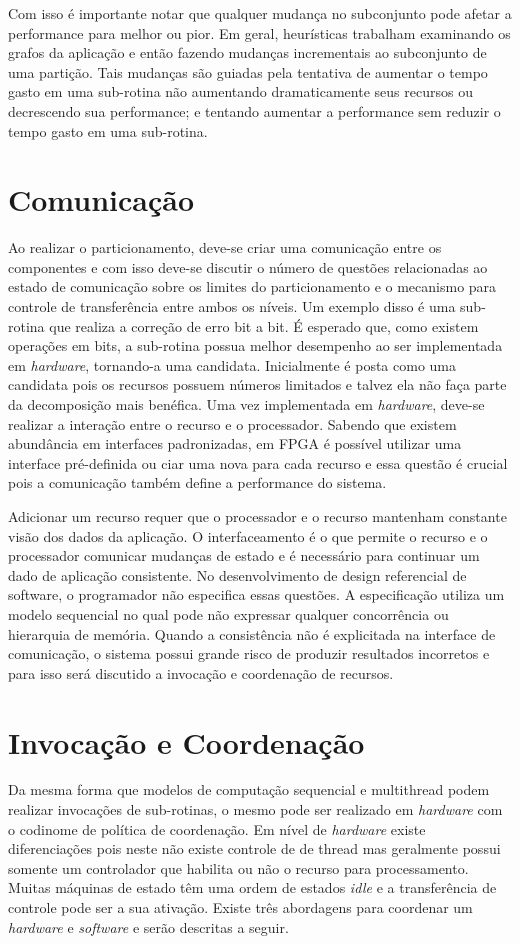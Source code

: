 Com isso é importante notar que qualquer mudança no subconjunto pode afetar a performance para melhor ou pior. Em geral, heurísticas trabalham examinando os grafos da aplicação e então fazendo mudanças incrementais ao subconjunto de uma partição. Tais mudanças são guiadas pela tentativa de aumentar o tempo gasto em uma sub-rotina não aumentando dramaticamente seus recursos ou decrescendo sua performance; e tentando aumentar a performance sem reduzir o tempo gasto em uma sub-rotina.

\section{Comunicação}
Ao realizar o particionamento, deve-se criar uma comunicação entre os componentes e com isso deve-se discutir o número de questões relacionadas ao estado de comunicação sobre os limites do particionamento e o mecanismo para controle de transferência entre ambos os níveis. Um exemplo disso é uma sub-rotina que realiza a correção de erro bit a bit. É esperado que, como existem operações em bits, a sub-rotina possua melhor desempenho ao ser implementada em \textit{hardware}, tornando-a uma candidata. Inicialmente é posta como uma candidata pois os recursos possuem números limitados e talvez ela não faça parte da decomposição mais benéfica. Uma vez implementada em \textit{hardware}, deve-se realizar a interação entre o recurso e o processador. Sabendo que existem abundância em interfaces padronizadas, em FPGA é possível utilizar uma interface pré-definida ou ciar uma nova para cada recurso e essa questão é crucial pois a comunicação também define a performance do sistema.

Adicionar um recurso requer que o processador e o recurso mantenham constante visão dos dados da aplicação. O interfaceamento é o que permite o recurso e o processador comunicar mudanças de estado e é necessário para continuar um dado de aplicação consistente. No desenvolvimento de design referencial de software, o programador não especifica essas questões. A especificação utiliza um modelo sequencial no qual pode não expressar qualquer concorrência ou hierarquia de memória. Quando a consistência não é explicitada na interface de comunicação, o sistema possui grande risco de produzir resultados incorretos e para isso será discutido a invocação e coordenação de recursos.

\section{Invocação e Coordenação}
Da mesma forma que modelos de computação sequencial e multithread podem realizar invocações de sub-rotinas, o mesmo pode ser realizado em \textit{hardware} com o codinome de política de coordenação. Em nível de \textit{hardware} existe diferenciações pois neste não existe controle de de thread mas geralmente possui somente um controlador que habilita ou não o recurso para processamento. Muitas máquinas de estado têm uma ordem de estados \textit{idle} e a transferência de controle pode ser a sua ativação. Existe três abordagens para coordenar um \textit{hardware} e \textit{software} e serão descritas a seguir.

